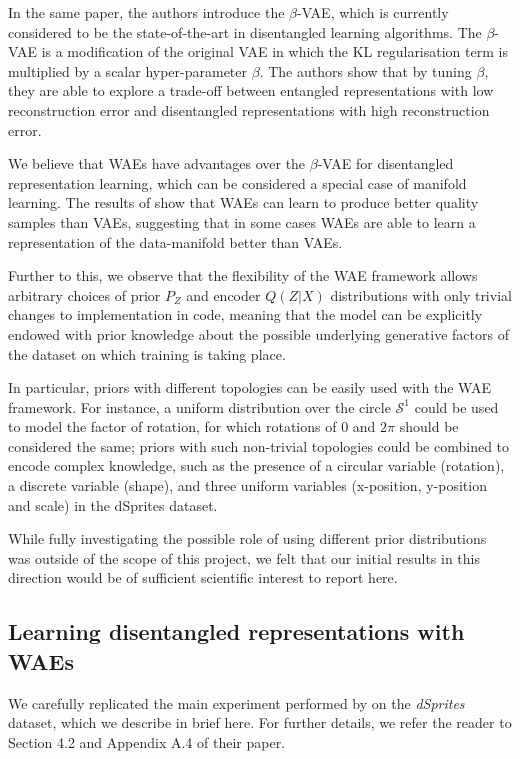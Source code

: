 \documentclass{article}
\begin{document}
In the same paper, the authors introduce the $\beta$-VAE, which is currently considered to be the state-of-the-art in disentangled learning algorithms. The $\beta$-VAE is a modification of the original VAE in which the KL regularisation term is multiplied by a scalar hyper-parameter $\beta$.
The authors show that by tuning $\beta$, they are able to explore a trade-off between entangled representations with low reconstruction error and disentangled representations with high reconstruction error.

We believe that WAEs have advantages over the $\beta$-VAE for disentangled representation learning, which can be considered a special case of manifold learning. The results of \citet{TBG+17} show that WAEs can learn to produce better quality samples than VAEs, suggesting that in some cases WAEs are able to learn a representation of the data-manifold better than VAEs. 

Further to this, we observe that the flexibility of the WAE framework allows arbitrary choices of prior $P_Z$ and encoder $Q(Z|X)$ distributions with only trivial changes to implementation in code, meaning that the model can be explicitly endowed with prior knowledge about the possible underlying generative factors of the dataset on which training is taking place. 

In particular, priors with different topologies can be easily used with the WAE framework. For instance, a uniform distribution over the circle $\mathcal{S}^1$ could be used to model the factor of rotation, for which rotations of $0$ and $2\pi$ should be considered the same; priors with such non-trivial topologies could be combined to encode complex knowledge, such as the presence of a circular variable (rotation), a discrete variable (shape), and three uniform variables (x-position, y-position and scale) in the dSprites dataset.

While fully investigating the possible role of using different prior distributions was outside of the scope of this project, we felt that our initial results in this direction would be of sufficient scientific interest to report here.
\vspace{-0.3cm}
\subsection{Learning disentangled representations with WAEs}

We carefully replicated the main experiment performed by \citet{HM+17} on the \emph{dSprites} dataset, which we describe in brief here. For further details, we refer the reader to Section 4.2 and Appendix A.4 of their paper.
\end{document}
